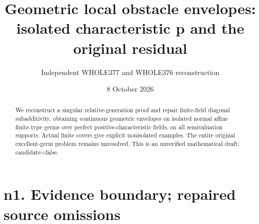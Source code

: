 \documentclass[11pt]{article}
\title{Geometric local obstacle envelopes: isolated characteristic p and the original residual}
\author{Independent WHOLE377 and WHOLE376 reconstruction}
\date{8 October 2026}
\begin{document}
\maketitle
\begin{abstract}
We reconstruct a singular relative-generation proof and repair finite-field
diagonal subadditivity, obtaining continuous geometric envelopes on isolated
normal affine finite-type germs over perfect positive-characteristic fields,
on all semivaluation supports. Actual finite covers give explicit nonisolated
examples. The entire original excellent-germ problem remains unresolved.
This is an unverified mathematical draft; candidate=false.
\end{abstract}
\tableofcontents

\section{n1. Evidence boundary; repaired source omissions}
\end{document}

